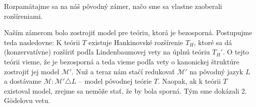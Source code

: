 Rozpamätajme sa na náš pôvodný zámer, načo sme sa vlastne zaoberali
rozšíreniami.
\begin{dokaz}
    Naším zámerom bolo zostrojiť model pre teóriu, ktorá je bezosporná.
    Postupujme teda nasledovne: K teórii $T$ existuje Hankinovské
    rozšírenie $T_H$, ktoré sa dá (konzervatívne) rozšíriť podľa
    Lindenbaumovej vety na úplnú teóriu $T_H'$. O tejto teórii vieme, že
    je bezosporná a teda vieme podľa vety o kanonickej štruktúre
    zostrojiť jej model $\mathcal{M}'$. Nuž a teraz nám stačí redukovať
    $\mathcal{M}'$ na pôvodný jazyk $L$ a dostávame
    $\mathcal{M}: \mathcal{M}' \triangle L$ -- model pôvodnej teórie $T$.
    Naopak, ak k teórii $T$ existoval model, zrejme sa nemôže stať, že by
    bola sporná. Tým sme dokázali 2. G\"odelovu vetu.
\end{dokaz}

